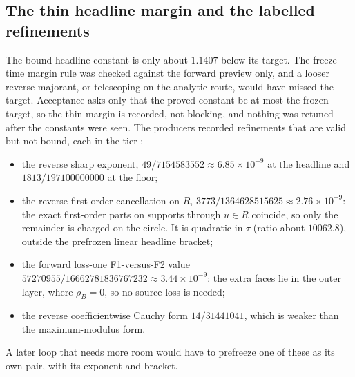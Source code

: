 \subsection{The thin headline margin and the labelled refinements}
\label{sec:ba1-margin}
The bound headline constant is only about $1.1407$ below its target. The
freeze-time margin rule was checked against the forward preview only, and a
looser reverse majorant, or telescoping on the analytic route, would have
missed the target. Acceptance asks only that the proved constant be at most
the frozen target, so the thin margin is recorded, not blocking, and nothing
was retuned after the constants were seen. The producers recorded
refinements that are valid but not bound, each in the tier
:
\begin{itemize}
\item the reverse sharp exponent, $49/7154583552\approx6.85\times10^{-9}$ at
 the headline and $1813/197100000000$ at the floor;
\item the reverse first-order cancellation on $R$,
 $3773/1364628515625\approx2.76\times10^{-9}$: the exact first-order parts on
 supports through $u\in R$ coincide, so only the remainder is charged on the
 circle. It is quadratic in $\tau$ (ratio about $10062.8$), outside the
 prefrozen linear headline bracket;
\item the forward loss-one F1-versus-F2 value
 $57270955/16662781836767232\approx3.44\times10^{-9}$: the extra faces lie in
 the outer layer, where $\rho_B=0$, so no source loss is needed;
\item the reverse coefficientwise Cauchy form $14/31441041$, which is weaker
 than the maximum-modulus form.
\end{itemize}
A later loop that needs more room would have to prefreeze one of these as its
own pair, with its exponent and bracket.

